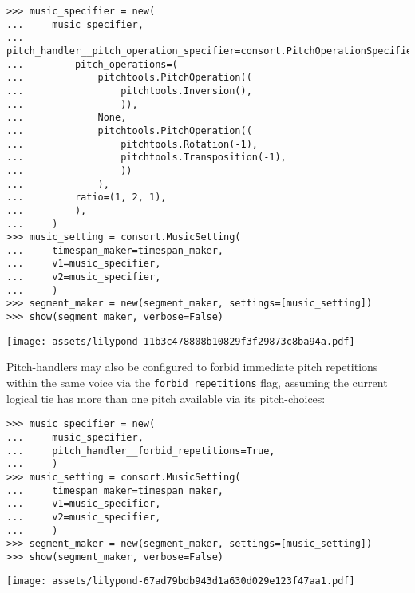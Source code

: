 \begin{abjadbookoutput}
\begin{singlespacing}
\vspace{-0.5\baselineskip}
\begin{verbatim}
>>> music_specifier = new(
...     music_specifier,
...     pitch_handler__pitch_operation_specifier=consort.PitchOperationSpecifier(
...         pitch_operations=(
...             pitchtools.PitchOperation((
...                 pitchtools.Inversion(),
...                 )),
...             None,
...             pitchtools.PitchOperation((
...                 pitchtools.Rotation(-1),
...                 pitchtools.Transposition(-1),
...                 ))
...             ),
...         ratio=(1, 2, 1),
...         ),
...     )
>>> music_setting = consort.MusicSetting(
...     timespan_maker=timespan_maker,
...     v1=music_specifier,
...     v2=music_specifier,
...     )
>>> segment_maker = new(segment_maker, settings=[music_setting])
>>> show(segment_maker, verbose=False)
\end{verbatim}
\noindent\texttt{[image: assets/lilypond-11b3c478808b10829f3f29873c8ba94a.pdf]}
\end{singlespacing}
\end{abjadbookoutput}

\noindent Pitch-handlers may also be configured to forbid immediate pitch
repetitions within the same voice via the \texttt{forbid\_repetitions} flag,
assuming the current logical tie has more than one pitch available via its
pitch-choices:

\begin{comment}
<abjad>[stylesheet=../consort.ily]
music_specifier = new(
    music_specifier,
    pitch_handler__forbid_repetitions=True,
    )
music_setting = consort.MusicSetting(
    timespan_maker=timespan_maker,
    v1=music_specifier,
    v2=music_specifier,
    )
segment_maker = new(segment_maker, settings=[music_setting])
show(segment_maker, verbose=False)
</abjad>
\end{comment}

\begin{abjadbookoutput}
\begin{singlespacing}
\vspace{-0.5\baselineskip}
\begin{verbatim}
>>> music_specifier = new(
...     music_specifier,
...     pitch_handler__forbid_repetitions=True,
...     )
>>> music_setting = consort.MusicSetting(
...     timespan_maker=timespan_maker,
...     v1=music_specifier,
...     v2=music_specifier,
...     )
>>> segment_maker = new(segment_maker, settings=[music_setting])
>>> show(segment_maker, verbose=False)
\end{verbatim}
\noindent\texttt{[image: assets/lilypond-67ad79bdb943d1a630d029e123f47aa1.pdf]}
\end{singlespacing}
\end{abjadbookoutput}


